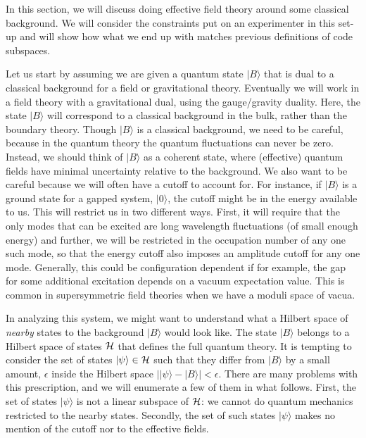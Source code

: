 \documentclass[12pt,nofootinbib, longbibliography]{revtex4-1}
\newcommand\ket[1]{| #1\rangle}
\begin{document}
In this section, we will discuss doing effective field theory around some classical background. We will consider the constraints put on an experimenter in this set-up and will show how what we end up with matches previous definitions of code subspaces.

Let us start by assuming we are given a quantum state  $\ket B$ that is dual to a classical background for a field or gravitational theory. Eventually we will work in a field theory with a gravitational dual, using the gauge/gravity duality. Here, the state $\ket B$ will correspond to a classical background in the bulk, rather than the boundary theory.  Though $\ket B$ is a classical background, we need to be careful, because in the quantum theory the quantum fluctuations can never be zero. Instead, we should think of $\ket B$ as a coherent state, where (effective) quantum fields have minimal uncertainty relative to the background.
 We also want to be careful because we will often have a cutoff to account for. For instance, if $\ket B$ is a ground state for a gapped system, $\ket 0$, the cutoff might be in the energy available to us. This will restrict us in two different ways. First, it will require that the only modes that can be excited are long wavelength fluctuations (of small enough energy) and further, we will be restricted in the occupation number of any one such
 mode, so that the energy cutoff also imposes an amplitude cutoff for any one mode.
 Generally, this could be configuration dependent if for example, the gap for some additional excitation depends on a vacuum expectation value. This is common in supersymmetric field theories when we have a moduli space of vacua. 

In analyzing this system, we might want to understand what a Hilbert space of {\em nearby} states to the background $\ket B$ would look like. The state $\ket B$ belongs to a Hilbert space of states ${\cal H}$ that defines the full quantum theory. It is tempting to consider the set of states  $\ket \psi \in {\cal H}$ such that they differ from $\ket B$ by a small amount,  $\epsilon$ inside the Hilbert space $|\ket \psi -\ket B|< \epsilon$. There are many problems with this prescription, and we will enumerate a few of them in what follows. First, the set of states $\ket \psi$ is not a linear subspace of ${\cal H}$: we cannot do quantum mechanics restricted to the nearby states. Secondly, the set of such states $\ket \psi$ makes no mention of the cutoff nor to the effective fields. 
\end{document}
